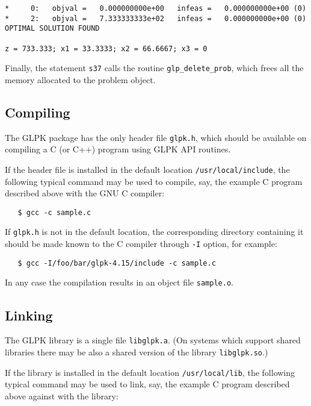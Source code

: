 {\footnotesize
\begin{verbatim}
*     0:   objval =   0.000000000e+00   infeas =   0.000000000e+00 (0)
*     2:   objval =   7.333333333e+02   infeas =   0.000000000e+00 (0)
OPTIMAL SOLUTION FOUND

z = 733.333; x1 = 33.3333; x2 = 66.6667; x3 = 0
\end{verbatim}

}

Finally, the statement \verb|s37| calls the routine
\verb|glp_delete_prob|, which frees all the memory allocated to the
problem object.

\subsection{Compiling}

The GLPK package has the only header file \verb|glpk.h|, which should
be available on compiling a C (or C++) program using GLPK API routines.

If the header file is installed in the default location
\verb|/usr/local/include|, the following typical command may be used to
compile, say, the example C program described above with the GNU C
compiler:

\begin{verbatim}
   $ gcc -c sample.c
\end{verbatim}

If \verb|glpk.h| is not in the default location, the corresponding
directory containing it should be made known to the C compiler through
\verb|-I| option, for example:

\begin{verbatim}
   $ gcc -I/foo/bar/glpk-4.15/include -c sample.c
\end{verbatim}

In any case the compilation results in an object file \verb|sample.o|.

\subsection{Linking}

The GLPK library is a single file \verb|libglpk.a|. (On systems which
support shared libraries there may be also a shared version of the
library \verb|libglpk.so|.)

If the library is installed in the default
location \verb|/usr/local/lib|, the following typical command may be
used to link, say, the example C program described above against with
the library:

